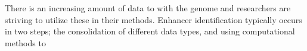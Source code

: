 
        There is an increasing amount of data to with the genome and researchers are striving to utilize these in their methods. Enhancer identification typically occurs in two steps; the consolidation of different data types, and using computational methods to  







